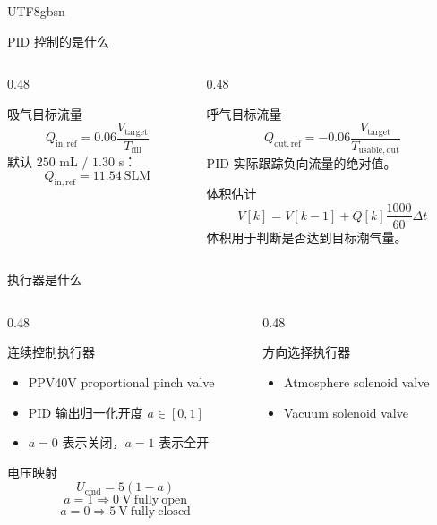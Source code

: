\documentclass[aspectratio=169,10pt]{beamer}
\begin{document}
\begin{CJK*}{UTF8}{gbsn}
\begin{frame}{PID 控制的是什么}
\begin{columns}[T,onlytextwidth]
\begin{column}{0.48\textwidth}
      \begin{block}{吸气目标流量}
        \[
          Q_{\mathrm{in,ref}}=0.06\frac{V_{\mathrm{target}}}{T_{\mathrm{fill}}}
        \]
        默认 $250$ mL / $1.30$ s：
        \[
          Q_{\mathrm{in,ref}}=11.54\ \mathrm{SLM}
        \]
      \end{block}
    \end{column}
    \begin{column}{0.48\textwidth}
      \begin{block}{呼气目标流量}
        \[
          Q_{\mathrm{out,ref}}=-0.06
          \frac{V_{\mathrm{target}}}{T_{\mathrm{usable,out}}}
        \]
        PID 实际跟踪负向流量的绝对值。
      \end{block}

      \begin{block}{体积估计}
        \[
          V[k]=V[k-1]+Q[k]\frac{1000}{60}\Delta t
        \]
        体积用于判断是否达到目标潮气量。
      \end{block}
    \end{column}
  \end{columns}
\end{frame}

\begin{frame}{执行器是什么}
  \begin{columns}[T,onlytextwidth]
    \begin{column}{0.48\textwidth}
      \begin{block}{连续控制执行器}
        \begin{itemize}
          \item PPV40V proportional pinch valve
          \item PID 输出归一化开度 $a\in[0,1]$
          \item $a=0$ 表示关闭，$a=1$ 表示全开
        \end{itemize}
      \end{block}

      \begin{block}{电压映射}
        \[
          U_{\mathrm{cmd}}=5(1-a)
        \]
        \[
          a=1 \Rightarrow 0\ \mathrm{V}\ \mathrm{fully\ open}
        \]
        \[
          a=0 \Rightarrow 5\ \mathrm{V}\ \mathrm{fully\ closed}
        \]
      \end{block}
    \end{column}
    \begin{column}{0.48\textwidth}
      \begin{block}{方向选择执行器}
        \begin{itemize}
          \item Atmosphere solenoid valve
          \item Vacuum solenoid valve
        \end{itemize}
      \end{block}


\end{column}
\end{columns}
\end{frame}
\end{CJK*}
\end{document}

